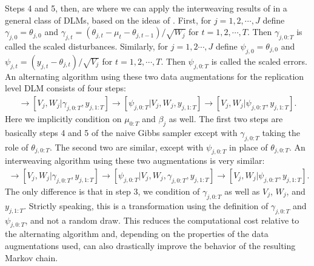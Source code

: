 \documentclass[graybox]{svmult}
\begin{document}
Steps 4 and 5, then, are where we can apply the interweaving results of \citet{simpson2014interweaving} in a general class of DLMs, based on the ideas of \citet{yu2011center}. First, for $j=1,2,\cdots,J$ define $\gamma_{j,0}=\theta_{j,0}$ and $\gamma_{j,t}=(\theta_{j,t} - \mu_t - \theta_{j,t-1})/\sqrt{W_j}$ for $t=1,2,\cdots,T$. Then $\gamma_{j,0:T}$ is called the scaled disturbances. Similarly, for $j=1,2\cdots,J$ define $\psi_{j,0}=\theta_{j,0}$ and $\psi_{j,t}=(y_{j,t} - \theta_{j,t})/\sqrt{V_j}$ for $t=1,2,\cdots,T$. Then $\psi_{j,0:T}$ is called the scaled errors. An alternating algorithm using these two data augmentations for the replication level DLM consists of four steps:
\begin{align*}
[\gamma_{j,0:T}|V_j,W_j,y_{j,1:T}] \to [V_j,W_j|\gamma_{j,0:T},y_{j,1:T}] \to [\psi_{j,0:T}|V_j,W_j,y_{j,1:T}] \to [V_j,W_j|\psi_{j,0:T},y_{j,1:T}].
\end{align*}
Here we implicitly condition on $\mu_{0:T}$ and $\beta_j$ as well. The first two steps are basically steps 4 and 5 of the naive Gibbs sampler except with $\gamma_{j,0:T}$ taking the role of $\theta_{j,0:T}$. The second two are similar, except with $\psi_{j,0:T}$ in place of $\theta_{j,0:T}$. An interweaving algorithm using these two augmentations is very similar:
\begin{align*}
[\gamma_{j,0:T}|V_j,W_j,y_{j,1:T}] \to [V_j,W_j|\gamma_{j,0:T},y_{j,1:T}] \to [\psi_{j,0:T}|V_j,W_j,\gamma_{j,0:T},y_{j,1:T}] \to [V_j,W_j|\psi_{j,0:T},y_{j,1:T}].
\end{align*}
The only difference is that in step 3, we condition of $\gamma_{j,0:T}$ as well as $V_j$, $W_j$, and $y_{j,1:T}$. Strictly speaking, this is a transformation using the definition of $\gamma_{j,0:T}$ and $\psi_{j,0:T}$, and not a random draw. This reduces the computational cost relative to the alternating algorithm and, depending on the properties of the data augmentations used, can also drastically improve the behavior of the resulting Markov chain.
\end{document}

